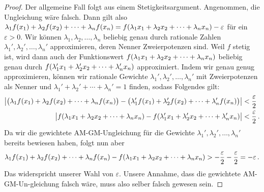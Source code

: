 \begin{proof}
	Der allgemeine Fall folgt aus einem Stetigkeitsargument. Angenommen, die Ungleichung wäre falsch. Dann gilt also $\lambda_1f(x_1)+\lambda_2f(x_2)+\dotsb+\lambda_nf(x_n)= f\parens*{\lambda_1x_1+\lambda_2 x_2+\dotsb+\lambda_nx_n}-\varepsilon$ für ein $\varepsilon>0$. Wir können $\lambda_1,\lambda_2,\dotsc,\lambda_n$ beliebig genau durch rationale Zahlen $\lambda_1',\lambda_2',\dotsc,\lambda_n'$ approximieren, deren Nenner Zweierpotenzen sind. Weil $f$ stetig ist, wird dann auch der Funktionswert $f\parens*{\lambda_1x_1+\lambda_2 x_2+\dotsb+\lambda_nx_n}$ beliebig genau durch $f\parens*{\lambda_1'x_1+\lambda_2' x_2+\dotsb+\lambda_n'x_n}$ approximiert. Indem wir genau genug approximieren, können wir rationale Gewichte $\lambda_1',\lambda_2',\dotsc,\lambda_n'$ mit Zweierpotenzen als Nenner und $\lambda_1'+\lambda_2'+\dotsb+\lambda_n'=1$ finden, sodass Folgendes gilt:
	\begin{align*}
		\abs[\big]{\parens[\big]{\lambda_1 f(x_1)+\lambda_2 f(x_2)+\dotsb+\lambda_nf(x_n)}-\parens[\big]{\lambda_1' f(x_1)+\lambda_2' f(x_2)+\dotsb+\lambda_n'f(x_n)}}&<\frac{\varepsilon}{2}\\
		\abs[\big]{f\parens*{\lambda_1x_1+\lambda_2 x_2+\dotsb+\lambda_nx_n}-f\parens*{\lambda_1'x_1+\lambda_2' x_2+\dotsb+\lambda_n'x_n}}&<\frac{\varepsilon}{2}\,.
	\end{align*}
	Da wir die gewichtete AM-GM-Ungleichung für die Gewichte $\lambda_1',\lambda_2',\dotsc,\lambda_n'$ bereits bewiesen haben, folgt nun aber
	\begin{equation*}
		\lambda_1 f(x_1)+\lambda_2 	f(x_2)+\dotsb+\lambda_nf(x_n)-f\parens*{\lambda_1x_1+\lambda_2 x_2+\dotsb+\lambda_nx_n}>-\frac{\varepsilon}2-\frac{\varepsilon}2=-\varepsilon\,.
	\end{equation*}
	Das widerspricht unserer Wahl von $\varepsilon$. Unsere Annahme, dass die gewichtete AM-GM-Un-gleichung falsch wäre, muss also selber falsch gewesen sein.
\end{proof}


